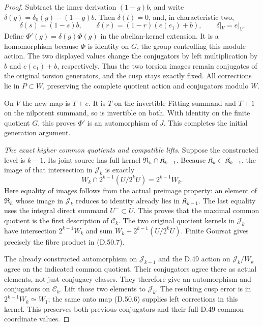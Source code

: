 \begin{proof}
Subtract the inner derivation \((1-g)b\), and
write \(\delta(g)=\delta_0(g)-(1-g)b\).
Then \(\delta(t)=0\), and, in characteristic two,
\[
 \delta(s)=(1-s)b,\qquad
 \delta(r)=(1-r)(e(e_1)+b),\qquad
 \delta|_V=e|_V.
 \tag{D.50.17}
\]
Define \(\Phi'(g)=\delta(g)\Phi(g)\) in the
abelian-kernel extension. It is a homomorphism
because \(\Phi\) is identity on \(G\), the
group controlling this module action.
The two displayed values change the conjugators
by left multiplication by \(b\) and \(e(e_1)+b\),
respectively. Thus the two torsion images remain
conjugates of the original torsion generators,
and the cusp stays exactly fixed. All corrections
lie in \(P\subset W\), preserving the complete
quotient action and conjugators modulo \(W\).

On \(V\) the new map is \(T+e\). It is \(T\)
on the invertible Fitting summand and \(T+1\)
on the nilpotent summand, so is invertible on
both. With identity on the finite quotient
\(G\), this proves \(\Phi'\) is an automorphism
of \(J\). This completes the initial generation
argument.

\emph{The exact higher common quotients and compatible lifts.}
Suppose the constructed level is \(k-1\).
Its joint source has full kernel
\(\mathfrak R_h\cap\mathfrak K_{k-1}\).
Because \(\mathfrak K_k\subset\mathfrak K_{k-1}\),
the image of that intersection in \(\mathcal J_k\)
is exactly
\[
  W_k\cap2^{k-1}(U/2^kU)=2^{k-1}W_k.
 \tag{D.50.18}
\]
Here equality of images follows from the actual
preimage property: an element of \(\mathfrak R_h\)
whose image in \(\mathcal J_k\) reduces to identity
already lies in \(\mathfrak K_{k-1}\).
The last equality uses the integral direct
summand \(U^-\subset U\).
This proves that the maximal common quotient
is the first description of \(\mathcal C_k\).
The two original quotient kernels in
\(\mathcal J_k\) have intersection \(2^{k-1}W_k\)
and sum \(W_k+2^{k-1}(U/2^kU)\).
Finite Goursat gives precisely the fibre product
in (D.50.7).

The already constructed automorphism on
\(\mathcal J_{k-1}\) and the D.49 action on
\(\mathcal J_k/W_k\) agree on the indicated
common quotient. Their conjugators agree there
as actual elements, not just conjugacy classes.
They therefore give an automorphism and
conjugators on \(\mathcal C_k\).
Lift those two elements to \(\mathcal J_k\).
The resulting cusp error is in
\(2^{k-1}W_k\simeq W_1\); the same onto map
(D.50.6) supplies left corrections in this
kernel. This preserves both previous conjugators
and their full D.49 common-coordinate values.


\end{proof}
